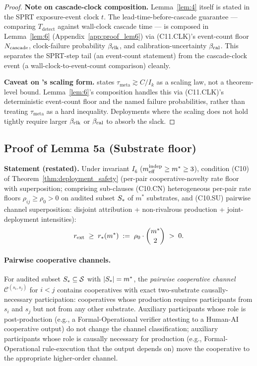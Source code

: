 \begin{proof}
\textbf{Note on cascade-clock composition.}  Lemma~\ref{lem:4}
itself is stated in the SPRT exposure-event clock $t$.  The
lead-time-before-cascade guarantee --- comparing $T_{\mathrm{detect}}$
against wall-clock cascade time --- is composed in
Lemma~\ref{lem:6} (Appendix~\ref{app:proof_lem6}) via (C11.CLK)'s
event-count floor $N_{\mathrm{cascade}}$, clock-failure probability $\beta_{\mathrm{clk}}$, and
calibration-uncertainty $\beta_{\mathrm{cal}}$.  This separates the SPRT-step
tail (an event-count statement) from the cascade-clock event (a
wall-clock-to-event-count comparison) cleanly.

\textbf{Caveat on
\citep[Phase~Redundancy]{lasser2026phase}'s scaling form.}
\citep[Phase~Redundancy]{lasser2026phase} states
$\tau_{\mathrm{meta}} \gtrsim C/I_k$ as a scaling law, not a
theorem-level bound.  Lemma~\ref{lem:6}'s composition handles
this via (C11.CLK)'s deterministic event-count floor and the
named failure probabilities, rather than treating
$\tau_{\mathrm{meta}}$ as a hard inequality.  Deployments where
the scaling does not hold tightly require larger $\beta_{\mathrm{clk}}$ or
$\beta_{\mathrm{cal}}$ to absorb the slack.
\end{proof}

\subsection{Proof of Lemma 5a (Substrate floor)}
\label{app:proof_lem5a}

\textbf{Statement (restated).}  Under invariant $I_6$ ($m_{\mathrm{eff}}^{\mathrm{indep}}
\geq m^* \geq 3$), condition (C10) of
Theorem~\ref{thm:deployment_safety} (per-pair cooperative-novelty
rate floor with superposition; comprising sub-clauses (C10.CN)
heterogeneous per-pair rate floors $\rho_{ij} \geq \rho_0 > 0$ on
audited subset $S_*$ of $m^*$ substrates, and (C10.SU)
pairwise channel superposition: disjoint attribution +
non-rivalrous production + joint-deployment intensities):
\[
  r_{\mathrm{ext}} \;\geq\; r_*(m^*) \;:=\; \rho_0 \cdot \binom{m^*}{2} \;>\; 0.
\]

\paragraph{Pairwise cooperative channels.}
For audited subset $S_* \subseteq \mathcal{S}$ with $|S_*|
= m^*$, the \emph{pairwise cooperative channel}
$\mathcal{C}^{(s_i, s_j)}$ for $i < j$ contains cooperatives with
exact two-substrate causally-necessary participation: cooperatives
whose production requires participants from $s_i$ and $s_j$ but
not from any other substrate.  Auxiliary participants whose role
is post-production (e.g., a Formal-Operational verifier attesting
to a Human-AI cooperative output) do not change the channel
classification; auxiliary participants whose role is causally
necessary for production (e.g., Formal-Operational rule-execution
that the output depends on) move the cooperative to the
appropriate higher-order channel.

